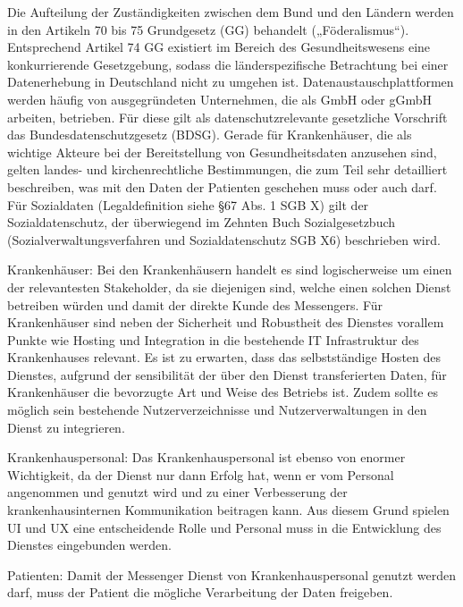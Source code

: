 Die  Aufteilung  der  Zuständigkeiten zwischen  dem Bund  und  den  Ländern  werden  in  den  Artikeln  70  bis 75 Grundgesetz (GG) behandelt („Föderalismus“). Entsprechend Artikel 74 GG existiert im Bereich des    Gesundheitswesens    eine    konkurrierende    Gesetzgebung,    sodass    die    länderspezifische    Betrachtung      bei      einer      Datenerhebung      in      Deutschland      nicht      zu      umgehen      ist.      Datenaustauschplattformen  werden  häufig  von  ausgegründeten  Unternehmen,  die  als  GmbH  oder  gGmbH  arbeiten,  betrieben.  Für  diese  gilt  als  datenschutzrelevante  gesetzliche  Vorschrift  das  Bundesdatenschutzgesetz  (BDSG).  Gerade  für  Krankenhäuser,  die  als  wichtige  Akteure  bei  der  Bereitstellung   von   Gesundheitsdaten   anzusehen   sind,   gelten   landes-   und   kirchenrechtliche   Bestimmungen,   die   zum   Teil   sehr   detailliert   beschreiben,   was   mit   den Daten der   Patienten   geschehen  muss  oder  auch  darf.  Für  Sozialdaten  (Legaldefinition  siehe  §67  Abs.  1  SGB  X)  gilt  der  Sozialdatenschutz,  der  überwiegend  im  Zehnten  Buch  Sozialgesetzbuch  (Sozialverwaltungsverfahren  und Sozialdatenschutz SGB X6) beschrieben wird.

Krankenhäuser: Bei den Krankenhäusern handelt es sind logischerweise um einen der relevantesten Stakeholder, da sie diejenigen sind, welche einen solchen Dienst betreiben würden und damit der direkte Kunde des Messengers. Für Krankenhäuser sind neben der Sicherheit und Robustheit des Dienstes vorallem Punkte wie Hosting und Integration in die bestehende IT Infrastruktur des Krankenhauses relevant. 
Es ist zu erwarten, dass das selbstständige Hosten des Dienstes, aufgrund der sensibilität der über den Dienst transferierten Daten, für Krankenhäuser die bevorzugte Art und Weise des Betriebs ist. Zudem sollte es möglich sein bestehende Nutzerverzeichnisse und Nutzerverwaltungen in den Dienst zu integrieren.

Krankenhauspersonal: Das Krankenhauspersonal ist ebenso von enormer Wichtigkeit, da der Dienst nur dann Erfolg hat, wenn er vom Personal angenommen und genutzt wird und zu einer Verbesserung der krankenhausinternen Kommunikation beitragen kann. Aus diesem Grund spielen UI und UX eine entscheidende Rolle und Personal muss in die Entwicklung des Dienstes eingebunden werden.

Patienten: Damit der Messenger Dienst von Krankenhauspersonal genutzt werden darf, muss der Patient die mögliche Verarbeitung der Daten freigeben.

